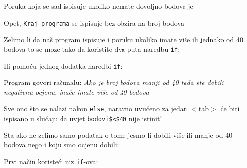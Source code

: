 Poruka koja se sad ispisuje ukoliko nemate dovoljno bodova je 


Opet, \verb"Kraj programa" se ispisuje bez obzira na broj bodova.

Zelimo li da naš program ispisuje i poruku ukoliko imate više ili jednako od 40 bodova to se moze
tako da koristite dva puta naredbu \verb"if":


Ili pomoću jednog dodatka naredbi \verb"if":


Program govori računalu:
\emph{Ako je broj bodova manji od 40 tada ste dobili negativnu
ocjenu, inače imate više od 40 bodova}

Sve ono što se nalazi nakon \verb"else", naravno uvučeno za jedan
$<$tab$>$ će biti ispisano u slučaju da uvjet \verb"bodovi$<$40" nije
istinit!

Sta ako ne zelimo samo podatak o tome jesmo li dobili više ili
manje od 40 bodova nego i koju smo ocjenu dobili:

Prvi način koristeći niz \verb"if"-ova:

